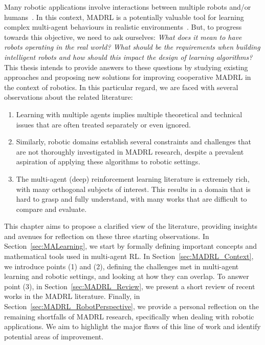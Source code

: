 Many robotic applications involve interactions between multiple robots and/or humans~\citep{Parker2016_MRS}. In this context, MADRL is a potentially valuable tool for learning complex multi-agent behaviours in realistic environments~\citep{Orr2023_MADRLRobots}. But, to progress towards this objective, we need to ask ourselves: \textit{What does it mean to have robots operating in the real world? What should be the requirements when building intelligent robots and how should this impact the design of learning algorithms?} This thesis intends to provide answers to these questions by studying existing approaches and proposing new solutions for improving cooperative MADRL in the context of robotics. In this particular regard, we are faced with several observations about the related literature:
\begin{enumerate}
    \item Learning with multiple agents implies multiple theoretical and technical issues that are often treated separately or even ignored.
    \item Similarly, robotic domains establish several constraints and challenges that are not thoroughly investigated in MADRL research, despite a prevalent aspiration of applying these algorithms to robotic settings.
    \item The multi-agent (deep) reinforcement learning literature is extremely rich, with many orthogonal subjects of interest. This results in a domain that is hard to grasp and fully understand, with many works that are difficult to compare and evaluate.
\end{enumerate}
This chapter aims to propose a clarified view of the literature, providing insights and avenues for reflection on these three starting observations. In Section~\ref{sec:MALearning}, we start by formally defining important concepts and mathematical tools used in multi-agent RL. In Section~\ref{sec:MADRL_Context}, we introduce points (1) and (2), defining the challenges met in multi-agent learning and robotic settings, and looking at how they can overlap. 
To answer point (3), in Section~\ref{sec:MADRL_Review}, we present a short review of recent works in the MADRL literature. 
Finally, in Section~\ref{sec:MADRL_RobotPerspective}, we provide a personal reflection on the remaining shortfalls of MADRL research, specifically when dealing with robotic applications. We aim to highlight the major flaws of this line of work and identify potential areas of improvement.








